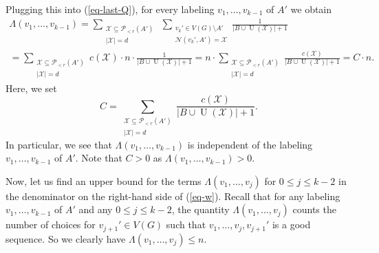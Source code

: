 \documentclass[11pt]{article}
\theoremstyle{definition}
\numberwithin{equation}{section}
\begin{document}
Plugging this into (\ref{eq-last-Q}), for every labeling $v_1,\dots,v_{k-1}$ of $A'$ we obtain
\begin{multline}\label{eq-Q-C}
\Lambda(v_1,\dots,v_{k-1})=\sum_{\substack{\mathcal{X}\subseteq \mathcal{P}\!_{<r}(A')\\ \vert \mathcal{X}\vert=d}}\ \sum_{\substack{v_{k}'\in V(G)\setminus A'\\ \mathcal{N}(v_k',A')=\mathcal{X}}}\frac{1}{\vert B\cup \operatorname{U}(\mathcal{X})\vert +1}\\
=\sum_{\substack{\mathcal{X}\subseteq \mathcal{P}\!_{<r}(A')\\ \vert \mathcal{X}\vert=d}}c(\mathcal{X})\cdot n\cdot \frac{1}{\vert B\cup \operatorname{U}(\mathcal{X})\vert +1}=n\cdot \sum_{\substack{\mathcal{X}\subseteq \mathcal{P}\!_{<r}(A')\\ \vert \mathcal{X}\vert=d}}\frac{c(\mathcal{X})}{\vert B\cup \operatorname{U}(\mathcal{X})\vert +1}=C\cdot n.
\end{multline}
Here, we set
\[C=\sum_{\substack{\mathcal{X}\subseteq \mathcal{P}\!_{<r}(A')\\ \vert \mathcal{X}\vert=d}}\frac{c(\mathcal{X})}{\vert B\cup \operatorname{U}(\mathcal{X})\vert +1}.\]
In particular, we see that $\Lambda(v_1,\dots,v_{k-1})$ is independent of the labeling $v_1,\dots,v_{k-1}$ of $A'$. Note that $C>0$ as $\Lambda(v_1,\dots,v_{k-1})>0$.

Now, let us find an upper bound for the terms $\Lambda(v_1,\dots,v_{j})$ for $0\leq j\leq k-2$ in the denominator on the right-hand side of (\ref{eq-w}). Recall that for any labeling $v_1,\dots,v_{k-1}$ of $A'$ and any $0\leq j\leq k-2$, the quantity  $\Lambda(v_1,\dots,v_{j})$ counts the number of choices for $v_{j+1}'\in V(G)$ such that $v_1,\dots,v_j,v_{j+1}'$ is a good sequence. So we clearly have $\Lambda(v_1,\dots,v_{j})\leq n$.
\end{document}
